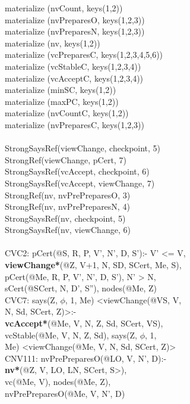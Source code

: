 \begin{code}
materialize (nvCount, keys(1,2))\\
materialize (nvPreparesO, keys(1,2,3))\\
materialize (nvPreparesN, keys(1,2,3))\\
materialize (nv, keys(1,2))\\
materialize (vcPreparesC, keys(1,2,3,4,5,6))\\
materialize (vcStableC, keys(1,2,3,4))\\
materialize (vcAcceptC, keys(1,2,3,4))\\
materialize (minSC, keys(1,2))\\
materialize (maxPC, keys(1,2))\\
materialize (nvCountC, keys(1,2))\\
materialize (nvPreparesC, keys(1,2,3))\\
\\
StrongSaysRef(viewChange, checkpoint, 5)\\
StrongRef(viewChange, pCert, 7)\\
StrongSaysRef(vcAccept, checkpoint, 6)\\
StrongSaysRef(vcAccept, viewChange, 7)\\
StrongRef(nv, nvPrePreparesO, 3)\\
StrongRef(nv, nvPrePreparesN, 4)\\
StrongSaysRef(nv, checkpoint, 5)\\
StrongSaysRef(nv, viewChange, 6)\\
\\
CVC2: pCert(@S, R, P, V', N', D, S'):- V' <= V, \\
\> \textbf{viewChange*}(@Z, V+1, N, SD, SCert, Me, S),\\
\> pCert(@Me, R, P, V', N', D, S'), N' > N,\\
\> sCert(@SCert, N, D', S''), nodes(@Me, Z)\\
CVC7: says(Z, $\phi$, 1, Me) <viewChange(@VS, V, \\
\> N, Sd, SCert, Z)>:-\\
\> \textbf{vcAccept*}(@Me, V, N, Z, Sd, SCert, VS),\\
\> vcStable(@Me, V, N, Z, Sd), says(Z, $\phi$, 1, \\
\> Me) <viewChange(@Me, V, N, Sd, SCert, Z)>\\
CNV111: nvPrePreparesO(@LO, V, N', D):-\\
\> \textbf{nv*}(@Z, V, LO, LN, SCert, S>),\\
\> vc(@Me, V), nodes(@Me, Z), \\
\> nvPrePreparesO(@Me, V, N', D)\\

\end{code}
